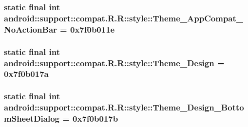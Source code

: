 \hypertarget{classandroid_1_1support_1_1compat_1_1_r_1_1style_90f36f78cbff6a82905299f279d90742}{
\subsubsection[{Theme\_\-AppCompat\_\-NoActionBar}]{\setlength{\rightskip}{0pt plus 5cm}static final int android::support::compat.R.R::style::Theme\_\-AppCompat\_\-NoActionBar = 0x7f0b011e}}
\label{classandroid_1_1support_1_1compat_1_1_r_1_1style_90f36f78cbff6a82905299f279d90742}


\hypertarget{classandroid_1_1support_1_1compat_1_1_r_1_1style_f45b22545c6dfeca172fa8e2efc6533b}{
\subsubsection[{Theme\_\-Design}]{\setlength{\rightskip}{0pt plus 5cm}static final int android::support::compat.R.R::style::Theme\_\-Design = 0x7f0b017a}}
\label{classandroid_1_1support_1_1compat_1_1_r_1_1style_f45b22545c6dfeca172fa8e2efc6533b}


\hypertarget{classandroid_1_1support_1_1compat_1_1_r_1_1style_0f5b9122a6a47228d261a6011693d53f}{
\subsubsection[{Theme\_\-Design\_\-BottomSheetDialog}]{\setlength{\rightskip}{0pt plus 5cm}static final int android::support::compat.R.R::style::Theme\_\-Design\_\-BottomSheetDialog = 0x7f0b017b}}
\label{classandroid_1_1support_1_1compat_1_1_r_1_1style_0f5b9122a6a47228d261a6011693d53f}



